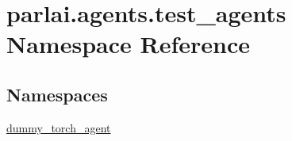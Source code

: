 \hypertarget{namespaceparlai_1_1agents_1_1test__agents}{}\section{parlai.\+agents.\+test\+\_\+agents Namespace Reference}
\label{namespaceparlai_1_1agents_1_1test__agents}
\subsection*{Namespaces}
\begin{DoxyCompactItemize}
\item 
 \hyperlink{namespaceparlai_1_1agents_1_1test__agents_1_1dummy__torch__agent}{dummy\+\_\+torch\+\_\+agent}
\end{DoxyCompactItemize}
